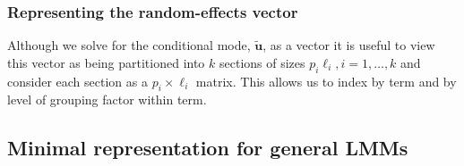 \documentclass{jss}
\begin{document}
\subsubsection{Representing the random-effects vector}
\label{sec:revector}

Although we solve for the conditional mode, $\tilde{\bm u}$, as a
vector it is useful to view this vector as being partitioned into $k$
sections of sizes $p_i\ell_i,i=1,\dots,k$ and consider each section as
a $p_i\times\ell_i$ matrix.  This allows us to index by term and by
level of grouping factor within term.

\subsection{Minimal representation for general LMMs}
\label{sec:MinimalRep}
\end{document}
